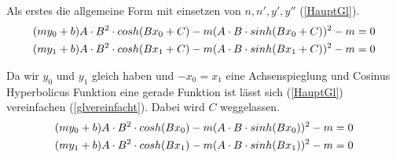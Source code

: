 Als erstes die allgemeine Form mit einsetzen von $n,n',y',y''$ (\eqref{HauptGl}).
\begin{align}
	(my_0+b)A\cdot B^2\cdot cosh(B x_0 + C)-m (A\cdot B\cdot sinh(B x_0 + C))^2-m &= 0\notag \\
	(my_1+b)A\cdot B^2\cdot cosh(B x_1 + C)-m (A\cdot B\cdot sinh(B x_1 + C))^2-m &=0 \label{HauptGl}
\end{align}

Da wir $y_0$ und $y_1$ gleich haben und $-x_0=x_1$ eine Achsenspieglung und Cosinus Hyperbolicus Funktion eine gerade Funktion ist lässt sich (\eqref{HauptGl}) vereinfachen (\eqref{glvereinfacht}). Dabei wird $C$ weggelassen.
\begin{align}
	(my_0+b)A\cdot B^2\cdot cosh(B x_0 )-m (A\cdot B\cdot sinh(B x_0 ))^2-m &= 0\notag \\
	(my_1+b)A\cdot B^2\cdot cosh(B x_1 )-m (A\cdot B\cdot sinh(B x_1 ))^2-m &=0 \label{glvereinfacht}
\end{align}

